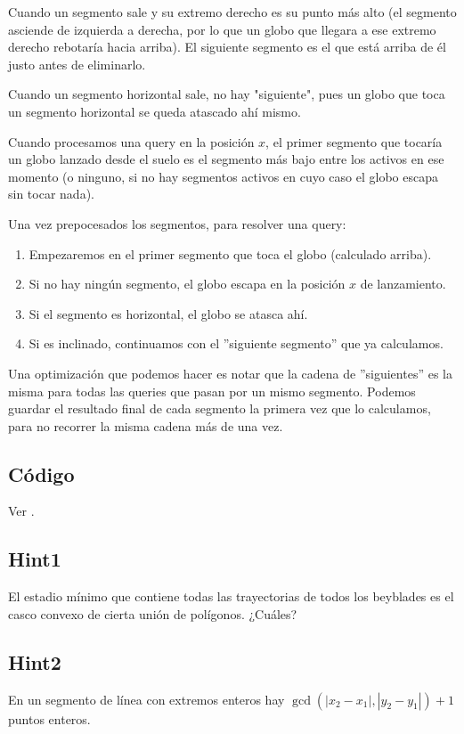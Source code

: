 Cuando un segmento sale y su extremo derecho es su punto
más alto (el segmento asciende de izquierda a derecha, por lo que un globo que llegara a ese extremo derecho rebotaría hacia arriba). El siguiente segmento es el que está arriba de él justo antes de eliminarlo.
 
Cuando un segmento horizontal sale, no hay
"siguiente", pues un globo que toca un segmento horizontal se queda atascado ahí mismo.
 
Cuando procesamos una query en la posición $x$, el
primer segmento que tocaría un globo lanzado desde el suelo es el segmento más bajo entre los activos en ese momento
(o ninguno, si no hay segmentos activos en cuyo caso el globo escapa sin tocar nada).
 
Una vez prepocesados los segmentos, para resolver una query:
 
\begin{enumerate}
    \item Empezaremos en el primer segmento que toca el globo (calculado arriba).
    \item Si no hay ningún segmento, el globo escapa en la
          posición $x$ de lanzamiento.
    \item Si el segmento es horizontal, el globo se atasca  ahí.
    \item Si es inclinado, continuamos con el ''siguiente segmento'' que ya calculamos.
\end{enumerate}
 
Una optimización que podemos hacer es notar que la cadena de ''siguientes'' es la misma para todas las
queries que pasan por un mismo segmento. Podemos guardar el resultado final de cada segmento la primera vez que lo calculamos, para no recorrer la misma cadena más de una vez.

\subsection*{Código}
Ver .
 
\subsection*{Hint1}
El estadio mínimo que contiene todas las trayectorias de todos los beyblades es el casco convexo de cierta unión de polígonos. ¿Cuáles?
\subsection*{Hint2}
En un segmento de línea con extremos enteros hay $\gcd(|x_2-x_1|,|y_2-y_1|)+1$ puntos enteros.
